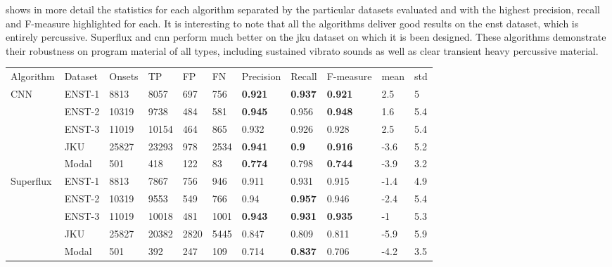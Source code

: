 { shows in more detail the statistics for each algorithm separated by the particular datasets evaluated and with the highest precision, recall and F-measure highlighted for each. It is interesting to note that all the algorithms deliver good results on the \acrshort{enst} dataset, which is entirely percussive. Superflux and \acrshort{cnn} perform much better on the \acrshort{jku} dataset on which it is been designed. These algorithms demonstrate their robustness on program material of all types, including sustained vibrato sounds as well as clear transient heavy percussive material.

\begin{table}
	\begin{threeparttable} 
		\begin{centering}
			\begin{tabular}{l l l l l l l l l l l}
				\tabletop
Algorithm & Dataset & Onsets & TP    & FP   & FN    & Precision & Recall & F-measure & mean & std \\
				\tablemid			
CNN       & ENST-1  & 8813   & 8057  & 697  & 756   & \textbf{0.921}     & \textbf{0.937}  & \textbf{0.921}     & 2.5  & 5   \\
          & ENST-2  & 10319  & 9738  & 484  & 581   & \textbf{0.945}     & 0.956  & \textbf{0.948}     & 1.6  & 5.4 \\
          & ENST-3  & 11019  & 10154 & 464  & 865   & 0.932     & 0.926  & 0.928     & 2.5  & 5.4 \\
          & JKU     & 25827  & 23293 & 978  & 2534  & \textbf{0.941  }   & \textbf{0.9}    & \textbf{0.916}     & -3.6 & 5.2 \\
          & Modal   & 501    & 418   & 122  & 83    & \textbf{0.774}     & 0.798  & \textbf{0.744}     & -3.9 & 3.2 \\
          \hdashline
Superflux & ENST-1  & 8813   & 7867  & 756  & 946   & 0.911     & 0.931  & 0.915     & -1.4 & 4.9 \\
          & ENST-2  & 10319  & 9553  & 549  & 766   & 0.94      & \textbf{0.957}  & 0.946     & -2.4 & 5.4 \\
          & ENST-3  & 11019  & 10018 & 481  & 1001  & \textbf{0.943 }    & \textbf{0.931}  & \textbf{0.935}     & -1   & 5.3 \\
          & JKU     & 25827  & 20382 & 2820 & 5445  & 0.847     & 0.809  & 0.811     & -5.9 & 5.9 \\
          & Modal   & 501    & 392   & 247  & 109   & 0.714     & \textbf{0.837}  & 0.706     & -4.2 & 3.5 \\

\end{tabular}
\end{centering}
\end{threeparttable}
\end{table}}
